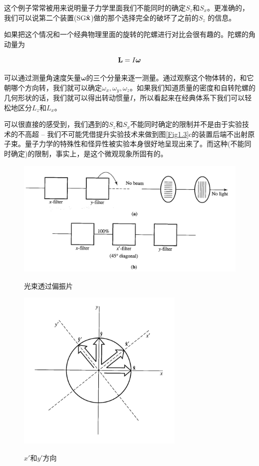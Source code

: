 \documentclass[UTF8,twoside]{ctexart}
\begin{document}
这个例子常常被用来说明量子力学里面我们不能同时的确定$S_z$和$S_x$。更准确的，我们可以说第二个装置(SG$\hat{\bf x}$)做的那个选择完全的破坏了之前的$S_z$ 的信息。

如果把这个情况和一个经典物理里面的旋转的陀螺进行对比会很有趣的。陀螺的角动量为

\begin{equation}
{\bf L} = I\bm\omega
\end{equation}

\noindent 可以通过测量角速度矢量$\bm \omega$的三个分量来逐一测量。通过观察这个物体转的，和它朝哪个方向转，我们就可以确定$\omega_x, \omega_y, \omega_z$。如果我们知道质量的密度和自转陀螺的几何形状的话，我们就可以得出转动惯量$I$，所以看起来在经典体系下我们可以轻松地区分$L_z$和$L_x$。

可以很直接的感受到，我们遇到的$S_z$和$S_x$不能同时确定的限制并不是由于实验技术的不高超 -- 我们不可能凭借提升实验技术来做到图{\ref{Fig1.3}}c的装置后端不出射原子束。量子力学的特殊性和怪异性被实验本身很好地呈现出来了。而这种(不能同时确定)的限制，事实上，是这个微观现象所固有的。


\begin{figure}
\begin{centering}
\includegraphics[width = 12cm]{./Sakurai/Fig_1.4.png}
\caption{光束透过偏振片}
\label {Fig1.4}
\includegraphics[width = 8cm]{./Sakurai/Fig_1.5.png}
\caption{$x'$和$y'$方向}
\label {Fig1.5}
\end{centering}
\end{figure}
\end{document}
